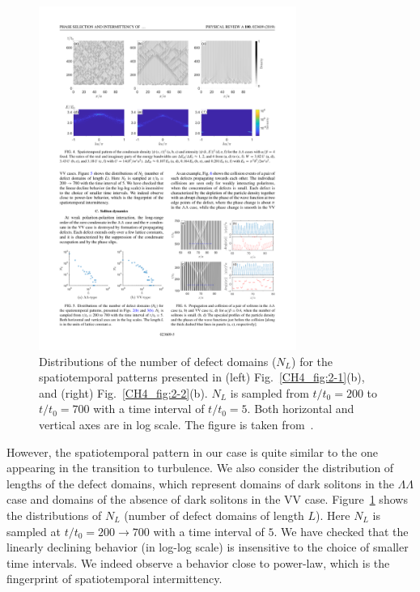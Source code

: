 %
%
%
\begin{figure}[ht]
\centering
\includegraphics[width=0.75\textwidth]{Fig/Ch4/fig5.pdf}
\caption[Distributions of the number of defect domains]{Distributions of the number of defect domains ($N_L$) for the spatiotemporal patterns presented in (left) Fig.~\ref{CH4_fig:2-1}(b), and (right) Fig.~\ref{CH4_fig:2-2}(b).
$N_L$ is sampled from $t/t_0=200$ to $t/t_0=700$ with a time interval of $t/t_0=5$.
Both horizontal and vertical axes are in log scale. The figure is taken from~\cite{Yoon:2019aa}.}
\label{CH4_fig:1}
\end{figure}
%
%

However, the spatiotemporal pattern in our case is quite similar to the one appearing in the transition to turbulence.
We also consider the distribution of lengths of the defect domains, which represent domains of dark solitons in the $\Lambda \Lambda$ case and domains of the absence of dark solitons in the VV case.
Figure~\ref{CH4_fig:1} shows the distributions of $N_L$ (number of defect domains of length $L$).
%
Here $N_L$ is sampled at $t/t_0 = 200\to 700$ with a time interval of $5$. We have checked that the linearly declining behavior (in log-log scale) is insensitive to the choice of smaller time intervals.
We indeed observe a behavior close to power-law, which is the fingerprint of spatiotemporal intermittency.

